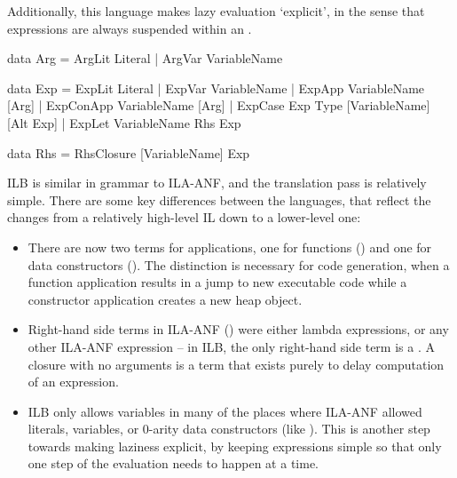 \documentclass[dissertation.tex]{subfiles}
\begin{document}
{{        Additionally, this language makes lazy evaluation `explicit', in the sense that expressions are always suspended within an .

        \begin{haskellfigure}
        data Arg = ArgLit Literal
                 | ArgVar VariableName

        data Exp = ExpLit Literal
                 | ExpVar VariableName
                 | ExpApp VariableName [Arg]
                 | ExpConApp VariableName [Arg]
                 | ExpCase Exp Type [VariableName] [Alt Exp]
                 | ExpLet VariableName Rhs Exp

        data Rhs = RhsClosure [VariableName] Exp
        \end{haskellfigure}

        ILB is similar in grammar to ILA-ANF, and the translation pass is relatively simple. There are some key differences between the languages, that reflect the changes from a relatively high-level IL down to a lower-level one:

        \begin{itemize}
        \item
        {
            There are now two terms for applications, one for functions () and one for data constructors (). The distinction is necessary for code generation, when a function application results in a jump to new executable code while a constructor application creates a new heap object. 
        }
        \item
        {
            Right-hand side terms in ILA-ANF () were either lambda expressions, or any other ILA-ANF expression -- in ILB, the only right-hand side term is a . A closure with no arguments is a term that exists purely to delay computation of an expression.
        }
        \item
        {
            ILB only allows variables in many of the places where ILA-ANF allowed literals, variables, or 0-arity data constructors (like ). This is another step towards making laziness explicit, by keeping expressions simple so that only one step of the evaluation needs to happen at a time.
        }
        \end{itemize}
    }
}
\end{document}
